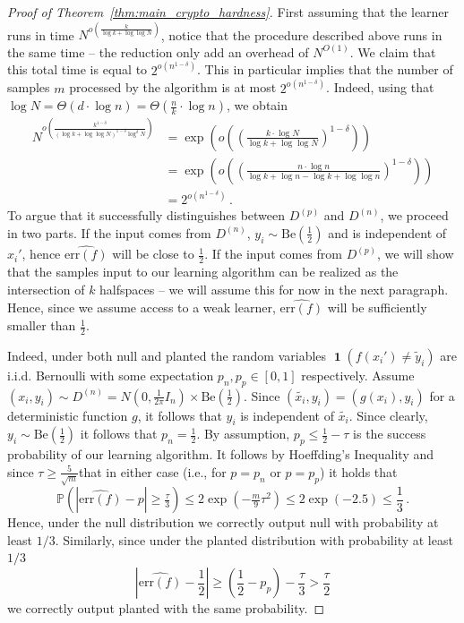 \documentclass{theoretics}
\newcommand{\Paren}[1]{\left(#1\right)}
\newcommand{\Abs}[1]{\left\lvert#1\right\rvert}
\newcommand{\Psymb}{\mathbb{P}}
\DeclareMathOperator{\Ind}{\mathbf 1}
\newcommand{\iid}{i.i.d.\xspace}
\renewcommand{\leq}{\leqslant}
\renewcommand{\geq}{\geqslant}
\newcommand{\err}{\mathrm{err}}
\newcommand{\Be}[1]{\mathrm{Be}(#1)}
\begin{document}
\begin{proof}[Proof of Theorem~\ref{thm:main_crypto_hardness}]
    First assuming that the learner runs in time $N^{o\Paren{\tfrac{k}{\log k + \log\log N}}}$, notice that the procedure described above runs in the same time -- the reduction only add an overhead of $N^{O(1)}$.
    We claim that this total time is equal to $2^{o(n^{1-\delta})}$.
    This in particular implies that the number of samples $m$ processed by the algorithm is at most $2^{o(n^{1-\delta})}$.
    Indeed, using that $\log N = \Theta(d \cdot \log n) = \Theta(\tfrac n k \cdot \log n)$, we obtain
    \begin{align*}
        N^{o\Paren{\tfrac{k^{1-\delta}}{\Paren{\log k + \log\log N}^{1-\delta} \log^\delta N}}} &= \exp\Paren{o\Paren{\Paren{\frac {k \cdot \log N}{\log k + \log\log N}}^{1-\delta}}} \\
        &= \exp\Paren{o\Paren{\Paren{\frac {n \cdot \log n}{\log k + \log n - \log k + \log\log n}}^{1-\delta}}} \\
        &=2^{o\Paren{n^{1-\delta}}}\,.
    \end{align*}
    To argue that it successfully distinguishes between $D^{(p)}$ and $D^{(n)}$, we proceed in two parts.
    If the input comes from $D^{(n)}$, $y_i \sim \Be{\tfrac 1 2}$ and is independent of $x_i'$, hence $\widehat{\err\Paren{f}}$ will be close to $\tfrac 1 2$.
    If the input comes from $D^{(p)}$, we will show that the samples input to our learning algorithm can be realized as the intersection of $k$ halfspaces -- we will assume this for now in the next paragraph.
    Hence, since we assume access to a weak learner, $\widehat{\err\Paren{f}}$ will be sufficiently smaller than $\tfrac 1 2$. 

    Indeed, under both null and planted the random variables $\Ind\Paren{f(x_i') \neq \tilde{y}_i}$ are \iid Bernoulli with some expectation $p_n,p_p \in [0,1]$ respectively.
    Assume $(x_i,y_i) \sim D^{(n)} = N\Paren{0,\tfrac 1 {2\pi} I_n} \times \Be{\tfrac 1 2}$.
    Since $(\tilde{x_i}, y_i) = (g(x_i), y_i)$ for a deterministic function $g$, it follows that $y_i$ is independent of $\tilde{x_i}$.
    Since clearly, $y_i \sim \Be{\tfrac 1 2}$ it follows that $p_n = \tfrac 1 2$.
    By assumption, $p_p \leq \tfrac 1 2 - \tau$ is the success probability of our learning algorithm.
    It follows by Hoeffding's Inequality \cite{hoeffding} and since $\tau \geq \tfrac 5 {\sqrt{m}}$that in either case (i.e., for $p = p_n$ or $p = p_p$) it holds that
    \[
        \Psymb\Paren{\Abs{\widehat{\err\Paren{f}} - p} \geq \tfrac \tau 3} \leq 2\exp\Paren{-\tfrac m 9 \tau^2} \leq 2\exp\Paren{-2.5} \leq \frac 1 3 \,.
    \]
    Hence, under the null distribution we correctly output null with probability at least $1/3$.
    Similarly, since under the planted distribution with probability at least $1/3$
    \[
        \Abs{\widehat{\err\Paren{f}} - \frac 1 2} \geq \Paren{\frac 1 2 - p_p} - \frac \tau 3 > \frac \tau 2
    \]
    we correctly output planted with the same probability.



\end{proof}
\end{document}
